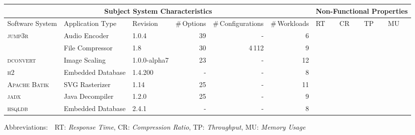 \begin{tabularx}{\textwidth}{lllrrr|XXXX}
		\toprule
		\multicolumn{6}{c}{\textbf{Subject System Characteristics}} & \multicolumn{4}{c}{\textbf{Non-Functional Properties}} \\
		\midrule
		Software System &  Application Type & Revision & \#\,Options & \#\,Configurations & \#\,Workloads & RT & CR & TP & MU \\
		\midrule
		\textsc{jump3r} & Audio Encoder & 1.0.4 & 39 & - & 6 & \xmark & \xmark &  & \xmark  \\
		
		\rowcolor{green!15}
		\kanzi & File Compressor & 1.8 & 30 & 4\,112 & 9 & \xmark & \xmark &  & \xmark  \\
			
		\textsc{dconvert} & Image Scaling & 1.0.0-alpha7 & 23 & - & 12 & \xmark  &  &  & \xmark  \\
				
		\textsc{h2} & Embedded Database & 1.4.200 & - & -  & 8 &   &  & \xmark &  \\
		
		\textsc{Apache Batik} & SVG Rasterizer & 1.14 & 25 & - &  11 & \xmark &   &  & \xmark  \\
		
		\textsc{jadx} & Java Decompiler & 1.2.0 & 25 & - & 9 & \xmark &  &  & \xmark  \\
			
		\textsc{hsqldb} & Embedded Database & 2.4.1 & - & - & 8  &  &  & \xmark &  \\
		

		
		
		
		
		\bottomrule
	\end{tabularx}
	
	{\vspace{2mm}
	{\footnotesize Abbreviations:$\quad$RT: \textit{Response Time}, CR: \textit{Compression Ratio}, TP: \textit{Throughput}, MU: \textit{Memory Usage}}}
	\vspace{0.1cm}
